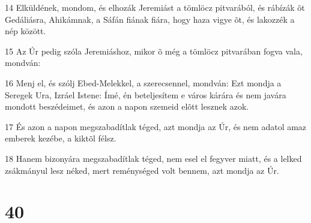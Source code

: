 \par 14 Elküldének, mondom, és elhozák Jeremiást a tömlöcz pitvarából, és rábízák õt Gedáliásra, Ahikámnak, a Sáfán fiának fiára, hogy haza vigye õt, és lakozzék a nép között.
\par 15 Az Úr pedig szóla Jeremiáshoz, mikor õ még a tömlöcz pitvarában fogva vala, mondván:
\par 16 Menj el, és szólj Ebed-Melekkel, a szerecsennel, mondván: Ezt mondja a Seregek Ura, Izráel Istene: Ímé, én beteljesítem e város kárára és nem javára mondott beszédeimet, és azon a napon szemeid elõtt lesznek azok.
\par 17 És azon a napon megszabadítlak téged, azt mondja az Úr, és nem adatol amaz emberek kezébe, a kiktõl félsz.
\par 18 Hanem bizonyára megszabadítlak téged, nem esel el fegyver miatt, és a lelked zsákmányul lesz néked, mert reménységed volt bennem, azt mondja az Úr.

\chapter{40}

